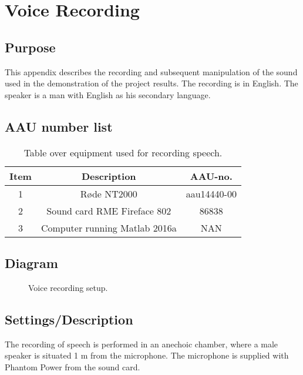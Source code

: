 \section{Voice Recording}
\subsection{Purpose}
This appendix describes the recording and subsequent manipulation of the sound used in the demonstration of the project results. The recording is in English. The speaker is a man with English as his secondary language. 

\subsection{AAU number list}
\begin{table}[H]
	\centering
	\begin{tabular}{ c c c } \toprule
		{Item}	& {Description} 						& {AAU-no}. \\ \bottomrule 
		1	& Røde NT2000 	& aau14440-00	\\
		2	& Sound card RME Fireface 802	& 86838 		\\
		3	& Computer running Matlab 2016a	 & 	NAN	\\
		\bottomrule
	\end{tabular}
	\caption{Table over equipment used for recording speech.}
	\label{tab:VoiceRec}
\end{table}

\subsection{Diagram}
\begin{figure}[H]
	\centering
	\caption{Voice recording setup.}
	\label{fig:VoiceRecording}
\end{figure}

\subsection{Settings/Description}
The recording of speech is performed in an anechoic chamber, where a male speaker is situated 1 m from the microphone. The microphone is supplied with Phantom Power from the sound card. \\ 

